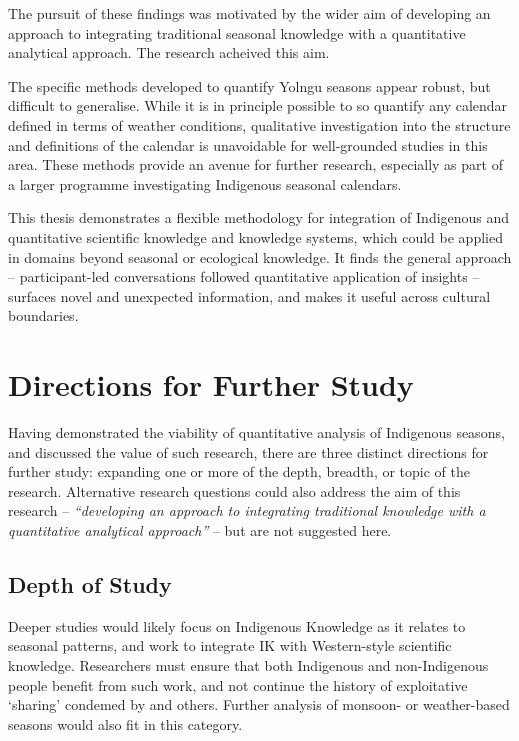 The pursuit of these findings was motivated by the wider aim of developing
an approach to integrating traditional seasonal knowledge with a quantitative
analytical approach.  The research acheived this aim.

The specific methods developed to quantify Yolngu seasons appear robust, but
difficult to generalise.  While it is in principle possible to so quantify
any calendar defined in terms of weather conditions, qualitative
investigation into the structure and definitions of the calendar is unavoidable
for well-grounded studies in this area.  These methods provide an
avenue for further research, especially as part of a larger programme
investigating Indigenous seasonal calendars.

This thesis demonstrates a flexible methodology for integration
of Indigenous and quantitative scientific knowledge and knowledge systems,
which could be applied in domains beyond seasonal or ecological knowledge.
It finds the general approach -- participant-led conversations followed quantitative
application of insights -- surfaces novel and unexpected information, and
makes it useful across cultural boundaries.



\section{Directions for Further Study}
\label{sec:further-study}

Having demonstrated the viability of quantitative analysis of Indigenous
seasons, and discussed the value of such research, there are three distinct
directions for further study:  expanding one or more of the depth, breadth,
or topic of the research.  Alternative research questions could also address the aim
of this research -- \textit{``developing an approach to integrating traditional
knowledge with a quantitative analytical approach''} -- but are not suggested
here.

\subsection{Depth of Study}
Deeper studies would likely focus on Indigenous Knowledge as it
relates to seasonal patterns, and work to integrate IK with Western-style scientific
knowledge.  Researchers must ensure that both Indigenous and non-Indigenous
people benefit from such work, and not continue the history of exploitative
`sharing' condemed by \citet{smith1999} and others.  Further analysis of monsoon-
or weather-based seasons would also fit in this category.

